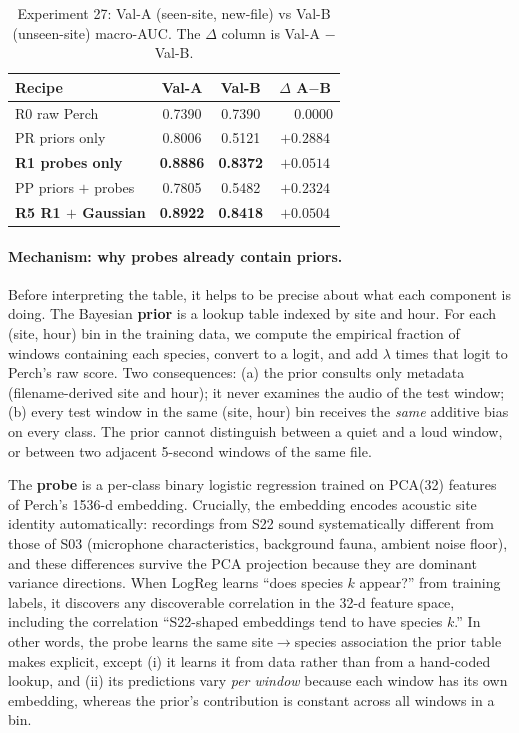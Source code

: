 \begin{table}[h]
\centering
\caption{Experiment 27: Val-A (seen-site, new-file) vs Val-B
(unseen-site) macro-AUC. The $\Delta$ column is Val-A $-$ Val-B.}
\label{tab:exp27}
\begin{tabular}{lccc}
\hline
\textbf{Recipe} & \textbf{Val-A} & \textbf{Val-B} & \textbf{$\Delta$ A$-$B} \\
\hline
R0 raw Perch                & 0.7390 & 0.7390 & $\phantom{-}0.0000$ \\
PR priors only              & 0.8006 & 0.5121 & $+0.2884$ \\
\textbf{R1 probes only}     & \textbf{0.8886} & \textbf{0.8372} & $+0.0514$ \\
PP priors $+$ probes        & 0.7805 & 0.5482 & $+0.2324$ \\
\textbf{R5 R1 $+$ Gaussian} & \textbf{0.8922} & \textbf{0.8418} & $+0.0504$ \\
\hline
\end{tabular}
\end{table}

\paragraph{Mechanism: why probes already contain priors.} Before
interpreting the table, it helps to be precise about what each
component is doing. The Bayesian \textbf{prior} is a lookup table
indexed by site and hour. For each (site, hour) bin in the training
data, we compute the empirical fraction of windows containing each
species, convert to a logit, and add $\lambda$ times that logit to
Perch's raw score. Two consequences: (a) the prior consults only
metadata (filename-derived site and hour); it never examines the
audio of the test window; (b) every test window in the same
(site, hour) bin receives the \emph{same} additive bias on every
class. The prior cannot distinguish between a quiet and a loud
window, or between two adjacent 5-second windows of the same file.

The \textbf{probe} is a per-class binary logistic regression trained
on PCA(32) features of Perch's 1536-d embedding. Crucially, the
embedding encodes acoustic site identity automatically: recordings
from S22 sound systematically different from those of S03 (microphone
characteristics, background fauna, ambient noise floor), and these
differences survive the PCA projection because they are dominant
variance directions. When LogReg learns ``does species $k$ appear?''
from training labels, it discovers any discoverable correlation in
the 32-d feature space, including the correlation
``S22-shaped embeddings tend to have species $k$.'' In other words,
the probe learns the same site$\to$species association the prior
table makes explicit, except (i) it learns it from data rather than
from a hand-coded lookup, and (ii) its predictions vary
\emph{per window} because each window has its own embedding, whereas
the prior's contribution is constant across all windows in a bin.

